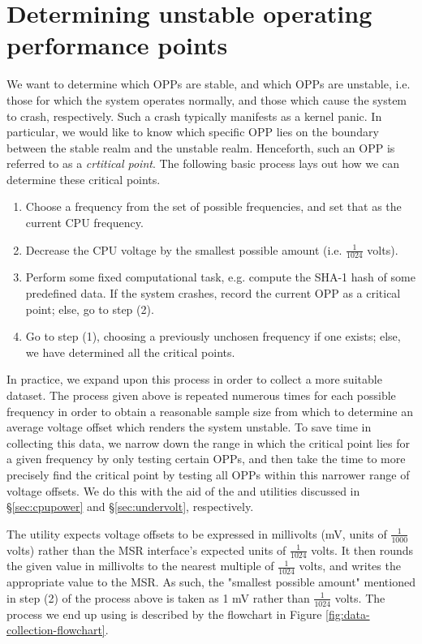 \section{Determining unstable operating performance points}
\label{sec:unstableOPPs}

We want to determine which OPPs are stable, and which OPPs are unstable, i.e.
those for which the system operates normally, and those which cause the system
to crash, respectively. Such a crash typically manifests as a kernel panic.
In particular, we would like to know which specific OPP lies on the boundary
between the stable realm and the unstable realm. Henceforth, such an OPP is
referred to as a \emph{crtitical point}. The following basic process lays out
how we can determine these critical points.

\begin{enumerate}
    \item Choose a frequency from the set of possible frequencies, and set that
        as the current CPU frequency.
    \item Decrease the CPU voltage by the smallest possible amount
        (i.e. $\frac{1}{1024}$ volts).
    \item Perform some fixed computational task, e.g. compute the SHA-1 hash of
        some predefined data. If the system crashes, record the current
        OPP as a critical point; else, go to step (2).
    \item Go to step (1), choosing a previously unchosen frequency if one
        exists; else, we have determined all the critical points.
\end{enumerate}

In practice, we expand upon this process in order to collect a more suitable
dataset. The process given above is repeated numerous times for each possible
frequency in order to obtain a reasonable sample size from which to determine
an average voltage offset which renders the system unstable. To save time in
collecting this data, we narrow down the range in which the critical point lies
for a given frequency by only testing certain OPPs, and then take the time to
more precisely find the critical point by testing all OPPs within this narrower
range of voltage offsets. We do this with the aid of the  and
 utilities discussed in §\ref{sec:cpupower} and
§\ref{sec:undervolt}, respectively.

The  utility expects voltage offsets to be expressed in
millivolts (mV, units of $\frac{1}{1000}$ volts) rather than the MSR interface's
expected units of $\frac{1}{1024}$ volts. It then rounds the given value in
millivolts to the nearest multiple of $\frac{1}{1024}$ volts, and writes the
appropriate value to the MSR. As such, the "smallest possible amount" mentioned
in step (2) of the process above is taken as 1 mV rather than $\frac{1}{1024}$
volts. The process we end up using is described by the flowchart in Figure
\ref{fig:data-collection-flowchart}.

